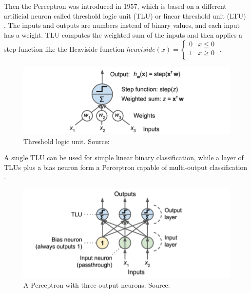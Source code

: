 \documentclass[a4paper,11pt,oneside]{article}
\begin{document}
  Then the Perceptron was introduced in 1957, which is based on a different artificial neuron called threshold logic unit
  (TLU) or linear threshold unit (LTU) \cite{rosenblatt1957perceptron}. The inputs and outputs are numbers instead of
  binary values, and each input has a weight. TLU computes the weighted sum of the inputs and then applies a step
  function like the Heaviside function
  $heaviside (x) =
  \begin{cases}
    0 & x \le 0 \\
    1 & x \geq 0 \\
  \end{cases}$
  \cite{geron2019hands, rosenblatt1957perceptron}.

  \begin{figure}[ht]
    \begin{center}
      \includegraphics[width=.8\textwidth]{tlu.png}
    \end{center}
    \caption{Threshold logic unit. Source: \cite{geron2019hands}}
  \end{figure}

  A single TLU can be used for simple linear binary classification, while a layer of TLUs plus a bias neuron form a
  Perceptron capable of multi-output classification \cite{geron2019hands}.

  \begin{figure}[ht]
    \begin{center}
      \includegraphics[width=.8\textwidth]{perceptron.png}
    \end{center}
    \caption{A Perceptron with three output neurons. Source: \cite{geron2019hands}}
  \end{figure}
\end{document}
